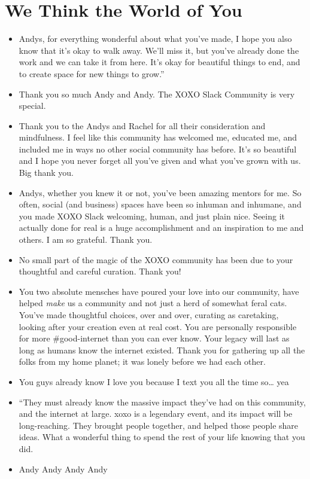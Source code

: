 \documentclass[
]{book}
\providecommand{\tightlist}{%
  \setlength{\itemsep}{0pt}\setlength{\parskip}{0pt}}
\begin{document}
\section{We Think the World of You}\label{we-think-the-world-of-you}

\begin{itemize}
\tightlist
\item
  Andys, for everything wonderful about what you've made, I hope you also know that it's okay to walk away. We'll miss it, but you've already done the work and we can take it from here. It's okay for beautiful things to end, and to create space for new things to grow.''
\item
  Thank you so much Andy and Andy. The XOXO Slack Community is very special.
\item
  Thank you to the Andys and Rachel for all their consideration and mindfulness. I feel like this community has welcomed me, educated me, and included me in ways no other social community has before. It's so beautiful and I hope you never forget all you've given and what you've grown with us. Big thank you.
\item
  Andys, whether you knew it or not, you've been amazing mentors for me. So often, social (and business) spaces have been so inhuman and inhumane, and you made XOXO Slack welcoming, human, and just plain nice. Seeing it actually done for real is a huge accomplishment and an inspiration to me and others. I am so grateful. Thank you.
\item
  No small part of the magic of the XOXO community has been due to your thoughtful and careful curation. Thank you!
\item
  You two absolute mensches have poured your love into our community, have helped \emph{make} us a community and not just a herd of somewhat feral cats. You've made thoughtful choices, over and over, curating as caretaking, looking after your creation even at real cost. You are personally responsible for more \#good-internet than you can ever know. Your legacy will last as long as humans know the internet existed. Thank you for gathering up all the folks from my home planet; it was lonely before we had each other.
\item
  You guys already know I love you because I text you all the time so\ldots{} yea
\item
  ``They must already know the massive impact they've had on this community, and the internet at large. xoxo is a legendary event, and its impact will be long-reaching. They brought people together, and helped those people share ideas. What a wonderful thing to spend the rest of your life knowing that you did.
\item
  Andy Andy Andy Andy
\end{itemize}
\end{document}
